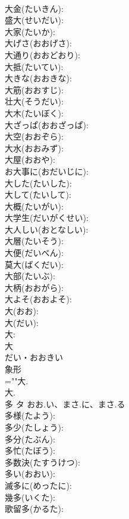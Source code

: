 \documentclass[8pt]{extreport}
\begin{document}
\begin{CJK}{UTF8}{min}
\\	大金(たいきん): 
\\	盛大(せいだい): 
\\	大家(たいか): 
\\	大げさ(おおげさ): 
\\	大通り(おおどおり): 
\\	大抵(たいてい): 
\\	大きな(おおきな): 
\\	大筋(おおすじ): 
\\	壮大(そうだい): 
\\	大木(たいぼく): 
\\	大ざっぱ(おおざっぱ): 
\\	大空(おおぞら): 
\\	大水(おおみず): 
\\	大屋(おおや): 
\\	お大事に(おだいじに): 
\\	大した(たいした): 
\\	大して(たいして): 
\\	大概(たいがい): 
\\	大学生(だいがくせい): 
\\	大人しい(おとなしい): 
\\	大層(たいそう): 
\\	大便(だいべん): 
\\	莫大(ばくだい): 
\\	大部(たいぶ): 
\\	大柄(おおがら): 
\\	大よそ(おおよそ): 
\\	大(おお): 
\\	大(だい): 
\\	大: 
\\	大	
\\	だい・おおきい	
\\	象形 
\\	=""大.
\\	大.
\\	多	タ	おお.い、まさ.に、まさ.る		
\\	多様(たよう): 
\\	多少(たしょう): 
\\	多分(たぶん): 
\\	多忙(たぼう): 
\\	多数決(たすうけつ): 
\\	多い(おおい): 
\\	滅多に(めったに): 
\\	幾多(いくた): 
\\	歌留多(かるた): 

\end{CJK}
\end{document}
